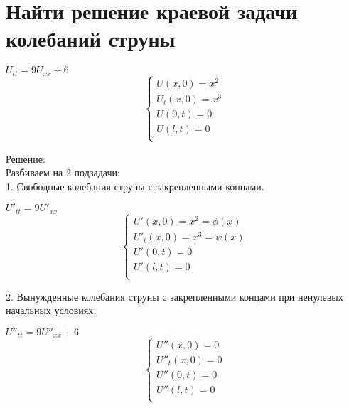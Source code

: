 \documentclass{article}
\begin{document}
    \section{Найти решение краевой задачи колебаний струны}
    \begin{center}
        $ U_{tt} = 9U_{xx} + 6 $ \\
        \begin{equation*} 
            \begin{cases}
                U(x, 0) = x^2 \\
                U_t(x, 0) = x^3 \\
                U(0, t) = 0 \\
                U(l, t) = 0 \\
            \end{cases}
		\end{equation*}
    \end{center}
    Решение: \\
    Разбиваем на 2 подзадачи: \\
    1. Свободные колебания струны с закрепленными концами.
    \begin{center}
        $ U'_{tt} = 9U'_{xx} $ \\
        \begin{equation*} 
            \begin{cases}
                U'(x, 0) = x^2 = \phi(x) \\
                U'_t(x, 0) = x^3 = \psi(x) \\
                U'(0, t) = 0 \\
                U'(l, t) = 0 \\
            \end{cases}
		\end{equation*}
    \end{center}
    2. Вынужденные колебания струны с закрепленными концами при ненулевых начальных условиях.
    \begin{center}
        $ U''_{tt} = 9U''_{xx} + 6 $ \\
        \begin{equation*} 
            \begin{cases}
                U''(x, 0) = 0 \\
                U''_t(x, 0) = 0 \\
                U''(0, t) = 0 \\
                U''(l, t) = 0 \\
            \end{cases}
		\end{equation*}
    \end{center}
\end{document}
